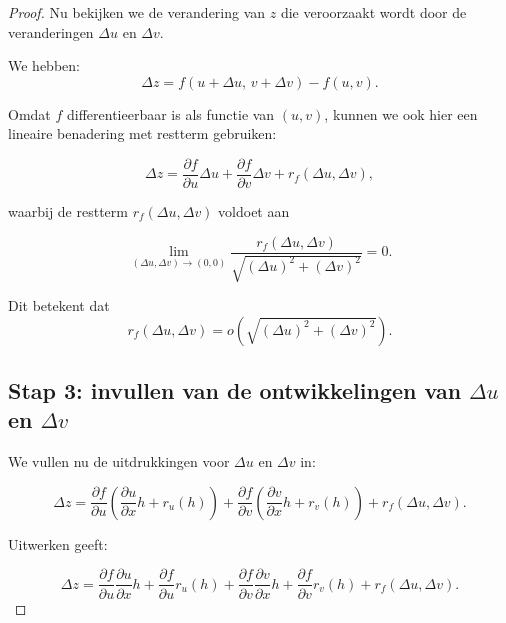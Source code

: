 \documentclass[11pt,a4paper]{article}
\begin{document}
\begin{proof}
        Nu bekijken we de verandering van $z$ die veroorzaakt wordt door de veranderingen
        $\Delta u$ en $\Delta v$.

        We hebben:
        \[
            \Delta z
            =
            f(u+\Delta u,\,v+\Delta v)-f(u,v).
        \]

        Omdat $f$ differentieerbaar is als functie van $(u,v)$, kunnen we ook hier een
        lineaire benadering met restterm gebruiken:

        \[
            \Delta z
            =
            \frac{\partial f}{\partial u}\Delta u
            +
            \frac{\partial f}{\partial v}\Delta v
            +
            r_f(\Delta u,\Delta v),
        \]

        waarbij de restterm $r_f(\Delta u,\Delta v)$ voldoet aan

        \[
            \lim_{(\Delta u,\Delta v)\to(0,0)}
            \frac{r_f(\Delta u,\Delta v)}
            {\sqrt{(\Delta u)^2+(\Delta v)^2}}
            =0.
        \]

        Dit betekent dat
        \[
            r_f(\Delta u,\Delta v)=o\!\left(\sqrt{(\Delta u)^2+(\Delta v)^2}\right).
        \]

        \subsection*{Stap 3: invullen van de ontwikkelingen van $\Delta u$ en $\Delta v$}

        We vullen nu de uitdrukkingen voor $\Delta u$ en $\Delta v$ in:

        \[
            \Delta z
            =
            \frac{\partial f}{\partial u}
            \left(
                \frac{\partial u}{\partial x}h + r_u(h)
            \right)
            +
            \frac{\partial f}{\partial v}
            \left(
                \frac{\partial v}{\partial x}h + r_v(h)
            \right)
            +
            r_f(\Delta u,\Delta v).
        \]

        Uitwerken geeft:

        \[
            \Delta z
            =
            \frac{\partial f}{\partial u}\frac{\partial u}{\partial x}h
            +
            \frac{\partial f}{\partial u}r_u(h)
            +
            \frac{\partial f}{\partial v}\frac{\partial v}{\partial x}h
            +
            \frac{\partial f}{\partial v}r_v(h)
            +
            r_f(\Delta u,\Delta v).
        \]


\end{proof}
\end{document}
